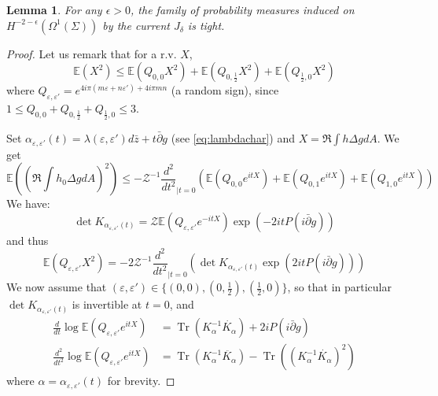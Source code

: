 \documentclass[10pt]{article}
\newcommand{\E}{\mathbb{E}}
\newcommand{\mc}{\mathcal}
\newcommand{\eps}{\varepsilon}
\newcommand{\Lap}{\Delta\!}
\newcommand{\dbar}{\bar\partial}
\DeclareMathOperator{\Tr}{Tr}
\newtheorem{Lem}[thm]{Lemma}
\begin{document}
\begin{Lem}
For any $\epsilon>0$, the family of probability measures induced on $H^{-2-\epsilon}(\Omega^1(\Sigma))$ by the current $J_\delta$ is tight.
\end{Lem}
\begin{proof}
%
%
%
%
%
%
%
%
%

%

Let us remark that for a r.v. $X$,
$$\E(X^2)\leq \E(Q_{0,0}X^2)+\E(Q_{0,\frac 12}X^2)+\E(Q_{\frac 12,0}X^2)$$
where $Q_{\eps,\eps'}=e^{4i\pi(m\eps+n\eps')+4i\pi mn}$ (a random sign), since $1\leq Q_{0,0}+Q_{0,\frac 12}+Q_{\frac 12,0}\leq 3$. 

Set $\alpha_{\eps,\eps'}(t)=\lambda(\eps,\eps')d\bar z+t\dbar g$ (see \eqref{eq:lambdachar}) and $X=\Re\int h\Lap g dA$. We get
%
$$\E((\Re\int h_0\Lap gdA)^2)\leq -{\mc Z}^{-1}{\frac{d^2}{dt^2}}_{|t=0}(\E(Q_{0,0}e^{itX})+\E(Q_{0,1}e^{itX})+\E(Q_{1,0}e^{itX}))$$
We have:
$$\det K_{\alpha_{\eps,\eps'}(t)}={\mc Z}\E(Q_{\eps,\eps'}e^{-itX})\exp(-2itP(i\dbar g))$$
and thus 
$$\E(Q_{\eps,\eps'}X^2)=-2{\mc Z}^{-1}{\frac{d^2}{dt^2}}_{|t=0}(\det K_{\alpha_{\eps,\eps'}(t)}\exp(2itP(i\dbar g)))$$
We now assume that $(\eps,\eps')\in\{(0,0),(0,\frac 12),(\frac 12,0)\}$, so that in particular $\det K_{\alpha_{\eps,\eps'}(t)}$ is invertible at $t=0$, and
\begin{align*}
\frac {d}{dt}\log\E(Q_{\eps,\eps'}e^{itX})&=\Tr(K_\alpha^{-1}\dot{K_\alpha})+2iP(i\dbar g)\\
\frac {d^2}{dt^2}\log\E(Q_{\eps,\eps'}e^{itX})&=\Tr(K_\alpha^{-1}\ddot{K_\alpha})-\Tr((K_\alpha^{-1}\dot {K_\alpha})^2)
\end{align*}
where $\alpha=\alpha_{\eps,\eps'}(t)$ for brevity.


\end{proof}
\end{document}

